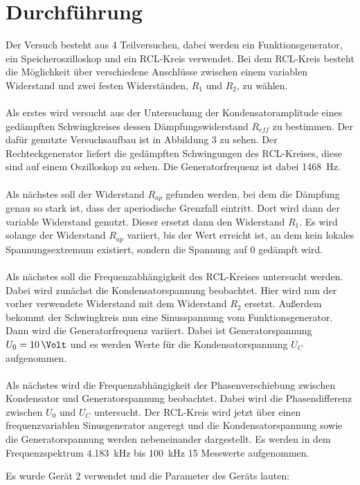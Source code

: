 \documentclass[
  bibliography=totoc,     %
  captions=tableheading,  %
  titlepage=firstiscover, %
]{scrartcl}
\begin{document}
\section{Durchführung}
\label{durchführung}
Der Versuch besteht aus 4 Teilversuchen, dabei werden ein Funktionsgenerator,
ein Speicheroszilloskop und ein RCL-Kreis verwendet. Bei dem RCL-Kreis besteht
die Möglichkeit über verschiedene Anschlüsse zwischen einem variablen Widerstand
und zwei festen Widerständen, $R_1$ und $R_2$, zu wählen. \\
\\
Als erstes wird versucht aus der Untersuchung der Kondensatoramplitude eines
gedämpften Schwingkreises dessen Dämpfungswiderstand $R_{eff}$ zu bestimmen.
Der dafür genutzte Versuchsaufbau ist in Abbildung 3 zu sehen. Der Rechteckgenerator
liefert die gedämpften Schwingungen des RCL-Kreises, diese sind auf einem
Oszilloskop zu sehen. Die Generatorfrequenz ist dabei \SI{1468}{\hertz}. \\
\\
Als nächstes soll der Widerstand $R_{ap}$ gefunden werden, bei dem die Dämpfung
genau so stark ist, dass der aperiodische Grenzfall eintritt. Dort wird dann
der variable Widerstand genutzt. Dieser ersetzt dann den Widerstand $R_1$. Es
wird solange der Widerstand $R_{ap}$ variiert, bis der Wert erreicht ist, an dem
kein lokales Spannungsextremum existiert, sondern die Spannung auf 0 gedämpft
wird. \\
\\
Als nächstes soll die Frequenzabhängigkeit des RCL-Kreises untersucht werden.
Dabei wird zunächst die Kondensatorspannung beobachtet. Hier wird nun der
vorher verwendete Widerstand mit dem Widerstand $R_2$ ersetzt. Außerdem bekommt
der Schwingkreis nun eine Sinusspannung vom Funktionsgenerator. Dann wird die
Generatorfrequenz variiert. Dabei ist Generatorspannung $U_0=\SI{10}{\Volt}$
und es werden Werte für die Kondensatorspannung $U_C$ aufgenommen. \\
\\
Als nächstes wird die Frequenzabhängigkeit der Phasenverschiebung zwischen
Kondensator und Generatorspannung beobachtet. Dabei wird die Phasendifferenz
zwischen $U_0$ und $U_C$ untersucht. Der RCL-Kreis wird jetzt über einen
frequenzvariablen Sinusgenerator angeregt und die Kondensatorspannung sowie die
Generatorspannung werden nebeneinander dargestellt. Es werden in dem
Frequenzspektrum \SI{4.183}{\kilo\hertz} bis \SI{100}{\kilo\hertz} 15 Messwerte aufgenommen.

Es wurde Gerät 2 verwendet und die Parameter des Geräts lauten:
\end{document}
